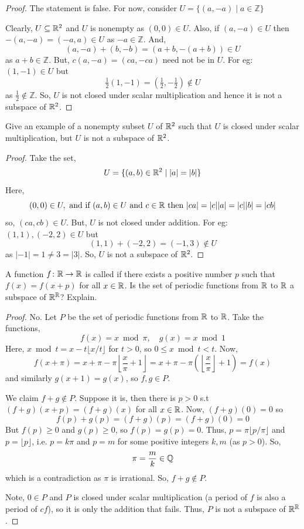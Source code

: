 \begin{proof}
The statement is false. For now, consider $U = \{(a, -a) \mid a \in \mathbb{Z}\}$

Clearly, $U \subseteq \mathbb{R}^2$ and $U$ is nonempty as $(0,0) \in U$. Also, if $(a,-a) \in U$ then $-(a,-a) = (-a,a) \in U$ as $-a \in \mathbb{Z}$. And,
\[
(a,-a) + (b,-b) = (a+b, -(a+b)) \in U
\]
as $a + b \in \mathbb{Z}$. But, $c(a,-a) = (ca, -ca)$ need not be in $U$. For eg: $(1,-1) \in U$ but
\[
\tfrac{1}{2}(1,-1) = \left(\tfrac{1}{2}, -\tfrac{1}{2}\right) \notin U
\]
as $\tfrac{1}{2} \notin \mathbb{Z}$. So, $U$ is not closed under scalar multiplication and hence it is not a subspace of $\mathbb{R}^2$.
\end{proof}

\begin{exercise}
Give an example of a nonempty subset $U$ of $\mathbb{R}^2$ such that $U$ is closed under scalar multiplication, but $U$ is not a subspace of $\mathbb{R}^2$.
\end{exercise}

\begin{proof}
Take the set,
\[
U = \{(a,b) \in \mathbb{R}^2 \mid |a| = |b|\}
\]
Here,
\[
(0,0) \in U, \text{ and if } (a,b) \in U \text{ and } c \in \mathbb{R} \text{ then } |ca| = |c||a| = |c||b| = |cb|
\]
so, $(ca, cb) \in U$. But, $U$ is not closed under addition. For eg: $(1,1), (-2,2) \in U$ but
\[
(1,1) + (-2,2) = (-1,3) \notin U
\]
as $|-1| = 1 \neq 3 = |3|$. So, $U$ is not a subspace of $\mathbb{R}^2$.
\end{proof}

\begin{exercise}
A function $f \colon \mathbb{R} \to \mathbb{R}$ is called  if there exists a positive number $p$ such that $f(x) = f(x + p)$ for all $x \in \mathbb{R}$. Is the set of periodic functions from $\mathbb{R}$ to $\mathbb{R}$ a subspace of $\mathbb{R}^{\mathbb{R}}$? Explain.
\end{exercise}

\begin{proof}
No. Let $P$ be the set of periodic functions from $\mathbb{R}$ to $\mathbb{R}$. Take the functions,
\[
f(x) = x \bmod \pi, \quad g(x) = x \bmod 1
\]
Here, $x \bmod t = x - t\lfloor x/t \rfloor$ for $t > 0$, so $0 \le x \bmod t < t$. Now,
\[
f(x + \pi) = x + \pi - \pi\left\lfloor \frac{x}{\pi} + 1 \right\rfloor = x + \pi - \pi\left(\left\lfloor \frac{x}{\pi} \right\rfloor + 1\right) = f(x)
\]
and similarly $g(x+1) = g(x)$, so $f, g \in P$.

We claim $f + g \notin P$. Suppose it is, then there is $p > 0$ s.t $(f+g)(x+p) = (f+g)(x)$ for all $x \in \mathbb{R}$. Now, $(f+g)(0) = 0$ so
\[
f(p) + g(p) = (f+g)(p) = (f+g)(0) = 0
\]
But $f(p) \ge 0$ and $g(p) \ge 0$, so $f(p) = g(p) = 0$. Thus, $p = \pi \lfloor p/\pi \rfloor$ and $p = \lfloor p \rfloor$, i.e. $p = k\pi$ and $p = m$ for some positive integers $k, m$ (as $p > 0$). So,
\[
\pi = \frac{m}{k} \in \mathbb{Q}
\]
which is a contradiction as $\pi$ is irrational. So, $f + g \notin P$.

Note, $0 \in P$ and $P$ is closed under scalar multiplication (a period of $f$ is also a period of $cf$), so it is only the addition that fails. Thus, $P$ is not a subspace of $\mathbb{R}^{\mathbb{R}}$.
\end{proof}

